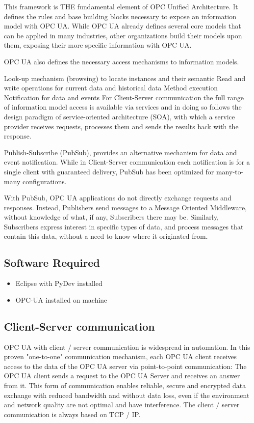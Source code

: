 \documentclass{article}
\begin{document}
This framework is THE fundamental element of OPC Unified Architecture. It defines the rules and base building blocks necessary to expose an information model with OPC UA. While OPC UA already defines several core models that can be applied in many industries, other organizations build their models upon them, exposing their more specific information with OPC UA.

OPC UA also defines the necessary access mechanisms to information models.

Look-up mechanism (browsing) to locate instances and their semantic
Read and write operations for current data and historical data
Method execution
Notification for data and events
For Client-Server communication the full range of information model access is available via services and in doing so follows the design paradigm of service-oriented architecture (SOA), with which a service provider receives requests, processes them and sends the results back with the response.

Publish-Subscribe (PubSub), provides an alternative mechanism for data and event notification. While in Client-Server communication each notification is for a single client with guaranteed delivery, PubSub has been optimized for many-to-many configurations.

With PubSub, OPC UA applications do not directly exchange requests and responses. Instead, Publishers send messages to a Message Oriented Middleware, without knowledge of what, if any, Subscribers there may be. Similarly, Subscribers express interest in specific types of data, and process messages that contain this data, without a need to know where it originated from.

	\subsection{Software Required}
	\begin{itemize}
	\item Eclipse with PyDev installed
	\item OPC-UA installed on machine 
	 \end{itemize}	

	\subsection{Client-Server communication}
	OPC UA with client / server communication is widespread in automation. In this proven "one-to-one" communication mechanism, each OPC UA client receives access to the data of the OPC UA server via point-to-point communication: The OPC UA client sends a request to the OPC UA Server and receives an answer from it. This form of communication enables reliable, secure and encrypted data exchange with reduced bandwidth and without data loss, even if the environment and network quality are not optimal and have interference. The client / server communication is always based on TCP / IP.
	\\
\end{document}
